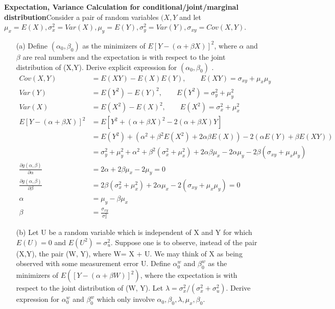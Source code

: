 \documentclass{article}
\begin{document}
\exercise
\textbf{Expectation, Variance Calculation for conditional/joint/marginal distribution}Consider a pair of random variables $(X, Y$ and let $\mu_x = E(X), \sigma_x^2= Var(X), \mu_y = E(Y), \sigma_y^2 = Var(Y), \sigma_{xy} = Cov(X,Y)$.
\begin{itemize}
    \item [(a)] Define $(\alpha_0, \beta_0)$ as the minimizers of $E[Y-(\alpha + \beta X)]^2$, where $\alpha$ and $\beta$ are real numbers and the expectation is with respect to the joint distribution of (X,Y). Derive explicit expression for $(\alpha_0, \beta_0)$ .
    \begin{align*}
    Cov(X,Y) &= E(XY) - E(X)E(Y), \qquad E(XY) = \sigma_{xy} + \mu_x\mu_y\\
    Var(Y) &= E(Y^2) - E(Y)^2, \qquad E(Y^2) = \sigma_y^2 + \mu_y^2\\
    Var(X) &= E(X^2) - E(X)^2, \qquad E(X^2) = \sigma_x^2 + \mu_x^2\\
     E[Y-(\alpha + \beta X)]^2 &= E[Y^2 + (\alpha + \beta X)^2 -2(\alpha + \beta X)Y ]\\
     &= E(Y^2) + (\alpha^2 + \beta^2 E(X^2) + 2\alpha\beta E(X)) - 2(\alpha E(Y) + \beta E(XY))\\
     &= \sigma_y^2+\mu_y^2 + \alpha^2 + \beta^2 (\sigma_x^2 + \mu_x^2) + 2\alpha\beta \mu_x -2\alpha \mu_y -2 \beta (\sigma_{xy}+ \mu_x\mu_y)\\
     \frac{\partial g(\alpha,\beta)}{\partial \alpha} &= 2\alpha + 2\beta \mu_x - 2\mu_y = 0\\
     \frac{\partial g(\alpha,\beta)}{\partial \beta} &=2\beta (\sigma_x^2 + \mu_x^2) + 2\alpha \mu_x -2(\sigma_{xy}+\mu_x\mu_y) = 0\\
     \alpha &= \mu_y - \beta \mu_x\\
     \beta &= \frac{\sigma_{xy}}{\sigma_x^2}
    \end{align*}    
    \item[(b)] Let U be a random variable which is independent of X and Y for which $E(U) = 0$ and $E(U^2) = \sigma_u^2$. Suppose one is to observe, instead of the pair (X,Y), the pair (W, Y), where W= X + U. We may think of X as being observed with some measurement error U. Define $\alpha_0^w$ and $\beta_0^w$ as the minimizers of $E([Y- (\alpha + \beta W)]^2)$, where the expectation is with respect to the joint distribution of (W, Y). Let $\lambda = \sigma_x^2/(\sigma_x^2 + \sigma_u^2)$. Derive expression for $\alpha_0^w$ and $\beta_0^w$ which only involve $\alpha_0, \beta_0, \lambda, \mu_x, \beta_0$.
    \begin{align*}

\end{align*}
\end{itemize}
\end{document}
